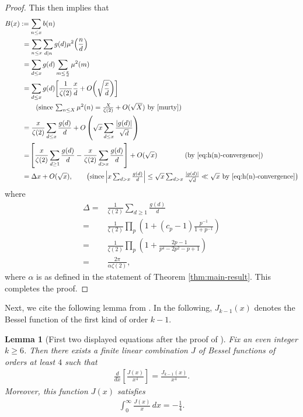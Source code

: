 \documentclass[12pt,letterpaper,reqno]{amsart}
\theoremstyle{plain}
\newtheorem{lemma}[theorem]{Lemma}
\theoremstyle{definition}
\numberwithin{equation}{section}
\numberwithin{figure}{section}
\numberwithin{table}{section}
\newcommand{\lrabs}[1]{\!\left\lvert #1 \right\lvert}
\newcommand{\lrp}[1]{\!\left(#1\right)}
\newcommand{\lrb}[1]{\!\left[#1\right]}
\begin{document}
\begin{proof}
    This then implies that
    \begin{align}
        B(x)
        \,\,&\!\!:=\sum_{n\le x}b(n) \\
        &= \sum_{n \le x} \sum_{d \mid n} g(d) \mu^2\lrp{\frac{n}{d}} 
        \\
        &=\sum_{d\le x}g(d)\sum_{m\le \frac{x}{d}}\mu^2(m)\\
        &= \sum_{d\le x}g(d) \lrb{
            \frac{1}{\zeta(2)} \frac{x}{d} + O\lrp{\sqrt{\frac{x}{d}}}
        } 
        \\
        &\qquad \text{(since $\textstyle \sum_{n\le X} \mu^2(n) = \frac{X}{\zeta(2)} + O(\sqrt X)$ by \cite[Exercise 4.4.10]{murty})}
        \\
        &= \frac{x}{\zeta(2)}\sum_{d\le x}\frac{g(d)}{d}+O\left(\sqrt{x}\sum_{d\le x}\frac{|g(d)|}{\sqrt{d}}\right) \\
        &= \lrb{
            \frac{x}{\zeta(2)} \sum_{d \ge 1} \frac{g(d)}{d} - \frac{x}{\zeta(2)} \sum_{d > x} \frac{g(d)}{d}
        }
        + O(\sqrt{x}) 
        \qquad\qquad \text{(by \eqref{eq:h(n)-convergence})}
        \\
        &= \Delta x+O(\sqrt{x}),
        \qquad \text{\big(since 
        $\textstyle
        \lrabs{x
        \sum_{d>x}\frac{g(d)}{d}
        }
        \le
        \sqrt{x}
        \sum_{d>x}\frac{|g(d)|}{\sqrt d}
        \ll \sqrt{x}
        $
        by \eqref{eq:h(n)-convergence}\big)}
    \end{align}    
where 
\begin{align*}
    \Delta=&\frac{1}{\zeta(2)}\sum_{d\ge1}\frac{g(d)}{d}\\
    =&\frac{1}{\zeta(2)}\prod_p\left(1+(c_p-1)\frac{p^{-1}}{1+p^{-1}}\right)\\
    =&\frac{1}{\zeta(2)}\prod_p\left(1+\frac{2p-1}{p^4-2p^2-p+1}\right) \\
    =& \frac{2\pi}{\alpha\zeta(2)},
\end{align*}
where $\alpha$ is as defined in the statement of Theorem \ref{thm:main-result}. This completes the proof.
\end{proof}

Next, we cite the following lemma from \cite{Zubrilina}. In the following, $J_{k-1}(x)$ denotes the Bessel function of the
first kind of order $k-1$.
\begin{lemma}[{First two displayed equations after the proof of \cite[Lemma 7.3]{Zubrilina}}] \label{lem:properties-of-J}
    Fix an even integer $k \ge 6$. Then there exists a finite linear combination $J$ of Bessel functions of orders at least $4$ such that
    \begin{align} \label{eq:J-definition}
        \frac{d}{dx}
        \left[\frac{J(x)}{x^4}\right]
        =
        \frac{J_{k-1}(x)}{x^4}.
    \end{align}
    Moreover, this function $J(x)$ satisfies
    \begin{align} \label{eq:J-integral}
        \int_0^\infty \frac{J(x)}{x}\, dx
        =-\frac14.
    \end{align}
\end{lemma}
\end{document}
